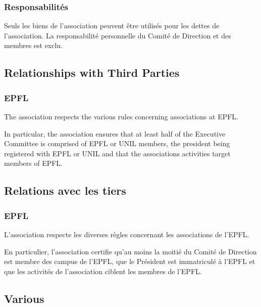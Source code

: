\documentclass[12pt,a4paper,oneside]{article}
\newcounter{art}
\newcommand{\english}{    \switchcolumn[0]\noindent}
\newcommand{\french}{    \switchcolumn[1]\noindent}
\begin{document}
\begin{paracol}{2}
	\french
	\subsubsection{Responsabilités}
	Seuls les biens de l’association peuvent être utilisés pour les dettes de l’association. La responsabilité personnelle du Comité de Direction et des membres est exclu.
		\vspace{1.5cm}



\english
	\subsection{Relationships with Third Parties}

	\subsubsection{EPFL}
	The association respects the various rules concerning associations at EPFL.

	In particular, the association ensures that at least half of the Executive Committee is comprised of EPFL or UNIL members, the president being registered with EPFL or UNIL and that the associations activities target members of EPFL. 
			\vspace{2.5cm}


\french
	\subsection{Relations avec les tiers}

	\subsubsection{EPFL}
	L’association respecte les diverses règles concernant les associations de l’EPFL.

	En particulier, l’association certifie qu’au moins la moitié du Comité de Direction est membre des campus de l’EPFL, que le Président est immatriculé à l’EPFL et que les activités de l’association ciblent les membres de l’EPFL.
			\vspace{2.5cm}






\english
	\subsection{Various}


\end{paracol}
\end{document}
